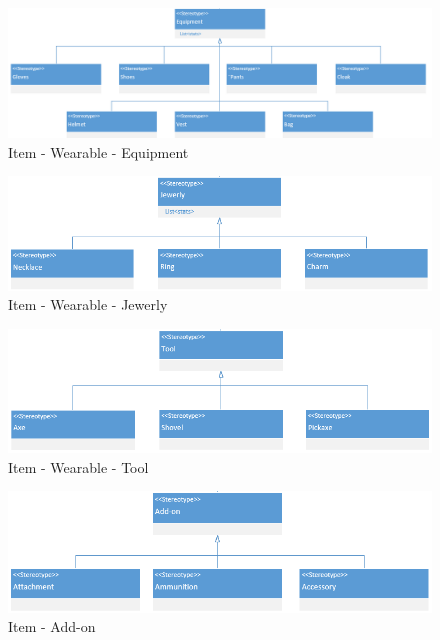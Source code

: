 \begin{figure}
    \begin{center}
    \includegraphics[width=20cm]{10_img/Z_annexeA/item_wearable_equipment.PNG} 
    \caption{Item - Wearable - Equipment}
    \label{A-Equipment}
    \end{center}
\end{figure}

\begin{figure}[H]
    \begin{center}
    \includegraphics[width=14cm]{10_img/Z_annexeA/item_wearable_jewerly.PNG} 
    \caption{Item - Wearable - Jewerly}
    \label{A-Jewerly}
    \end{center}
\end{figure}

\begin{figure}[H]
    \begin{center}
    \includegraphics[width=14cm]{10_img/Z_annexeA/item_werable_tool.PNG} 
    \caption{Item - Wearable - Tool}
    \label{A-Tool}
    \end{center}
\end{figure}

\begin{figure}[H]
    \begin{center}
    \includegraphics[width=14cm]{10_img/Z_annexeA/item_addon.PNG} 
    \caption{Item - Add-on}
    \label{A-Add-on}
    \end{center}
\end{figure}

